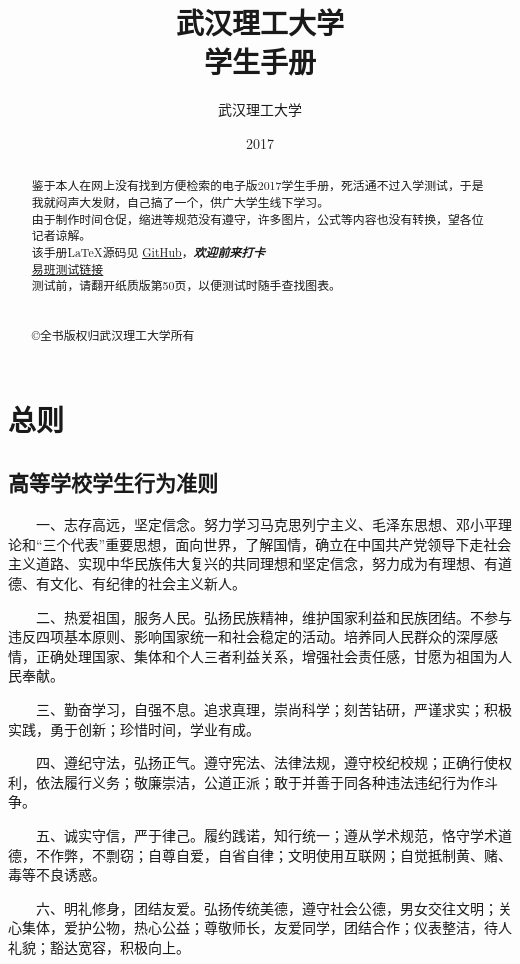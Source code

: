 \documentclass[UTF8,12pt,a4paper]{report}
\title{\textbf{武汉理工大学} \\ \textbf{学生手册}}
\author{武汉理工大学}
\date{2017}
\begin{document}
	
	\maketitle
\begin{abstract}
鉴于本人在网上没有找到方便检索的电子版2017学生手册，死活通不过入学测试，于是我就闷声大发财，自己搞了一个，供广大学生线下学习。\\
由于制作时间仓促，缩进等规范没有遵守，许多图片，公式等内容也没有转换，望各位记者谅解。\\
该手册\LaTeX 源码见 \href{https://github.com/Markhng/WHUT-Student-Handbook/}{\underline{GitHub}}，\textbf{\textit{欢迎前来打卡}}\\
\href{http://www.yiban.cn/t/student/showtk/}{\underline{易班测试链接}}\\
测试前，请翻开纸质版第50页，以便测试时随手查找图表。\\\\\\
\copyright 全书版权归武汉理工大学所有
\end{abstract}
	\tableofcontents
\part{总则}
\chapter{高等学校学生行为准则}
　　一、志存高远，坚定信念。努力学习马克思列宁主义、毛泽东思想、邓小平理论和“三个代表”重要思想，面向世界，了解国情，确立在中国共产党领导下走社会主义道路、实现中华民族伟大复兴的共同理想和坚定信念，努力成为有理想、有道德、有文化、有纪律的社会主义新人。

　　二、热爱祖国，服务人民。弘扬民族精神，维护国家利益和民族团结。不参与违反四项基本原则、影响国家统一和社会稳定的活动。培养同人民群众的深厚感情，正确处理国家、集体和个人三者利益关系，增强社会责任感，甘愿为祖国为人民奉献。

　　三、勤奋学习，自强不息。追求真理，崇尚科学；刻苦钻研，严谨求实；积极实践，勇于创新；珍惜时间，学业有成。

　　四、遵纪守法，弘扬正气。遵守宪法、法律法规，遵守校纪校规；正确行使权利，依法履行义务；敬廉崇洁，公道正派；敢于并善于同各种违法违纪行为作斗争。

　　五、诚实守信，严于律己。履约践诺，知行统一；遵从学术规范，恪守学术道德，不作弊，不剽窃；自尊自爱，自省自律；文明使用互联网；自觉抵制黄、赌、毒等不良诱惑。

　　六、明礼修身，团结友爱。弘扬传统美德，遵守社会公德，男女交往文明；关心集体，爱护公物，热心公益；尊敬师长，友爱同学，团结合作；仪表整洁，待人礼貌；豁达宽容，积极向上。
\end{document}
